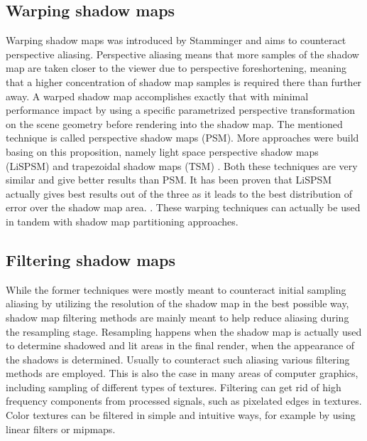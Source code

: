 \subsection{Warping shadow maps}
Warping shadow maps was introduced by Stamminger \cite{bib:article:stamminger_psm} and aims to counteract perspective aliasing. Perspective aliasing means that more samples of the shadow map are taken closer to the viewer due to perspective foreshortening, meaning that a higher concentration of shadow map samples is required there than further away. A warped shadow map accomplishes exactly that with minimal performance impact by using a specific parametrized perspective transformation on the scene geometry before rendering into the shadow map. The mentioned technique is called perspective shadow maps (PSM). More approaches were build basing on this proposition, namely light space perspective shadow maps (LiSPSM) \cite{bib:proc:wimmer_lispsm} and trapezoidal shadow maps (TSM) \cite{bib:proc:matrin_tsm}. Both these techniques are very similar and give better results than PSM. It has been proven that LiSPSM actually gives best results out of the three as it leads to the best distribution of error over the shadow map area. \cite{bib:proc:lloyd_lispsm_vs_tsm}. These warping techniques can actually be used in tandem with shadow map partitioning approaches.


\subsection{Filtering shadow maps}
\label{section:filtering_shadow_maps}
While the former techniques were mostly meant to counteract initial sampling aliasing by utilizing the resolution of the shadow map in the best possible way, shadow map filtering methods are mainly meant to help reduce aliasing during the resampling stage. Resampling happens when the shadow map is actually used to determine shadowed and lit areas in the final render, when the appearance of the shadows is determined. Usually to counteract such aliasing various filtering methods are employed. This is also the case in many areas of computer graphics, including sampling of different types of textures. Filtering can get rid of high frequency components from processed signals, such as pixelated edges in textures. Color textures can be filtered in simple and intuitive ways, for example by using linear filters or mipmaps.

